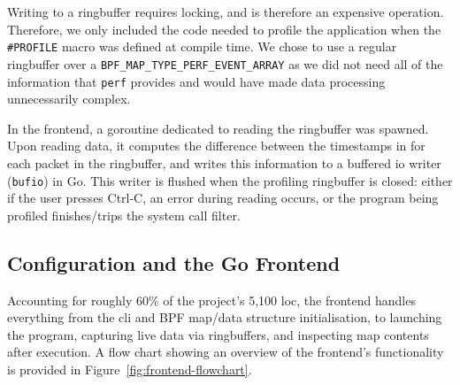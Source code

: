 Writing to a ringbuffer requires locking, and is therefore an expensive
operation. Therefore, we only included the code needed to profile the
application when the \texttt{\#PROFILE} macro was defined at compile time.
We chose to use a regular ringbuffer over a 
\texttt{BPF\_MAP\_TYPE\_PERF\_EVENT\_ARRAY} as we did not need all of the
information that \texttt{perf} provides and would have made data processing
unnecessarily complex.

In the frontend, a goroutine dedicated to reading the ringbuffer was spawned.
Upon reading data, it computes the difference between the timestamps in for each 
packet in the ringbuffer, and writes this information to a buffered \ac{io} 
writer (\texttt{bufio}) in Go. This writer is flushed when the profiling 
ringbuffer is closed: either if the user presses Ctrl-C, an error during 
reading occurs, or the program being profiled finishes/trips the system call 
filter.

\subsection{Configuration and the Go Frontend}\label{subsec:impl-frontend}

Accounting for roughly 60\% of the project's 5,100 \ac{loc}, the frontend handles 
everything from the \ac{cli} and BPF  map/data structure initialisation, to 
launching the program, capturing live data via ringbuffers, and inspecting 
map contents after execution. A flow chart showing an overview of the frontend's
functionality is provided in Figure~\ref{fig:frontend-flowchart}.


